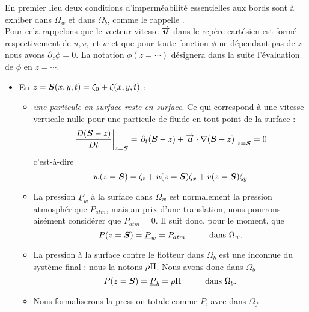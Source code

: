 \noindent En premier lieu deux conditions d'imperméabilité essentielles aux bords sont à exhiber dans $\Omega_w$ et dans $\Omega_b$, comme le rappelle \citet{Pons2018}.\\
Pour cela rappelons que le vecteur vitesse $\overrightarrow{\boldsymbol{u}}$ dans le repère cartésien est formé respectivement de $u, v,$ et $w$ et que pour toute fonction $\phi$ ne dépendant pas de $z$ nous avons $\partial_z \phi = 0$. La notation $\phi (z = \cdots)$ désignera dans la suite l'évaluation de $\phi$ en $z=\cdots$.
\begin{itemize}[label=$\mybullet$]
	\item En $z = \boldsymbol{S}(x, y, t) = \zeta_0 + \zeta(x, y, t)$ : 
	\begin{itemize}[label=$\mybullet\mybullet$]
		\item \textit{une particule en surface reste en surface}. Ce qui correspond à une vitesse verticale nulle pour une particule de fluide en tout point de la surface : 
		\begin{equation*}
		\left. \frac{D (\boldsymbol{S} - z)}{Dt} \right|_{z=\boldsymbol{S}} = \left. \partial_t (\boldsymbol{S} - z) + \overrightarrow{\boldsymbol{u}} \cdot \nabla (\boldsymbol{S} - z) \right|_{z=\boldsymbol{S}} = 0
		\end{equation*}
		c'est-à-dire
		\begin{equation}
		w(z = \boldsymbol{S}) = \zeta_t + u(z=\boldsymbol{S})\zeta_x + v(z=\boldsymbol{S})\zeta_y \label{eq:surfacecondition}
		\end{equation}
		\item La pression $\underline{P}_w$ à la surface dans $\Omega_w$ est normalement la pression atmosphérique $P_{atm}$, mais au prix d'une translation, nous pourrons aisément considérer que $P_{atm} = 0$. Il suit donc, pour le moment, que 
		\begin{equation}
			P (z=\boldsymbol{S}) = \underline{P}_w = P_{atm}\hspace{1cm}\text{dans $\Omega_w$.}\label{eq:pression_cond}
		\end{equation}
		\item La pression à la surface contre le flotteur dans $\Omega_b$ est une inconnue du système final : nous la notons $\rho\Pi$. Nous avons donc dans $\Omega_b$
		\begin{equation}
		P(z=\boldsymbol{S}) = \underline{P}_b =  \rho\Pi \hspace{1cm}\text{dans $\Omega_b$.} \label{eq:pression_cond_b}
		\end{equation}
		\item Nous formaliserons la pression totale comme $P$, avec dans $\Omega_f$ 

\end{itemize}
\end{itemize}

